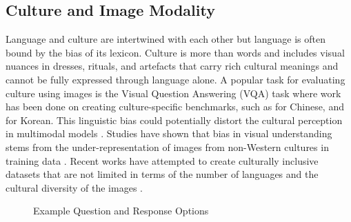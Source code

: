 \subsection{Culture and Image Modality}
Language and culture are intertwined with each other but language is often bound by the bias of its lexicon. 
Culture is more than words and includes visual nuances in dresses, rituals, and artefacts that carry rich cultural meanings and cannot be fully expressed through language alone. A popular task for evaluating culture using images is the Visual Question Answering (VQA) task where work has been done on creating culture-specific benchmarks, such as \citet{Wang2024CVLUEAN} for Chinese, and \citet{Baek2024EvaluatingVA} for Korean. This linguistic bias could potentially distort the cultural perception in multimodal models \citep{ventura2023navigating}. Studies have shown that bias in visual understanding stems from the under-representation of images from non-Western cultures in training data \citep{shankar2017no}. Recent works have attempted to create culturally inclusive datasets that are not limited in terms of the number of languages and the cultural diversity of the images \citep{romero2024cvqa,bhatia2024local}. 




\begin{figure}[ht]
\centering
\scriptsize
\caption{Example Question and Response Options}
\label{fig:question-options}
\end{figure}


